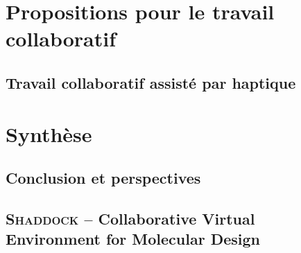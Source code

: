 \documentclass[myfrancais]{mythesis}
\newcommand{\acro}[1]{\textsc{#1}}
\begin{document}
	\part{Propositions pour le travail collaboratif}
	\chapter{Travail collaboratif assisté par haptique}
	\part{Synthèse}
	\chapter{Conclusion et perspectives}

	\appendix
	\chapter{\acro{Shaddock} -- Collaborative Virtual Environment for Molecular Design}
\end{document}
